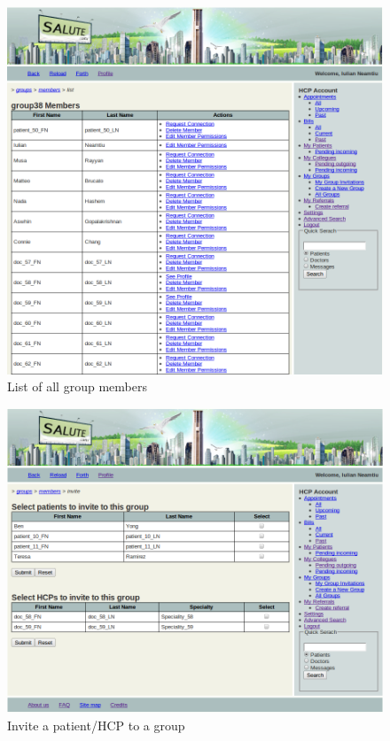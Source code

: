 \begin{figure}
\includegraphics[scale=0.5]{screenshots/list_group_members.png}
\caption{List of all group members}
\end{figure}

\begin{figure}
\includegraphics[scale=0.5]{screenshots/invite_members_to_group.png}
\caption{Invite a patient/HCP to a group}
\end{figure}

